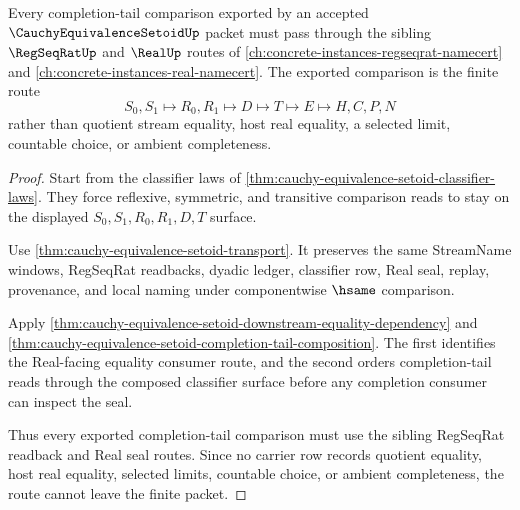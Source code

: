 \begin{theorem}
\label{thm:cauchy-equivalence-setoid-regseqrat-route}
Every completion-tail comparison exported by an accepted $\CauchyEquivalenceSetoidUp$ packet must pass through the sibling $\RegSeqRatUp$ and $\RealUp$ routes of \autoref{ch:concrete-instances-regseqrat-namecert} and \autoref{ch:concrete-instances-real-namecert}. The exported comparison is the finite route
$$
S_0,S_1 \longmapsto R_0,R_1 \longmapsto D \longmapsto T \longmapsto E \longmapsto H,C,P,N
$$
rather than quotient stream equality, host real equality, a selected limit, countable choice, or ambient completeness.
\end{theorem}
\begin{proof}
Start from the classifier laws of \autoref{thm:cauchy-equivalence-setoid-classifier-laws}. They force reflexive, symmetric, and transitive comparison reads to stay on the displayed $S_0,S_1,R_0,R_1,D,T$ surface.

Use \autoref{thm:cauchy-equivalence-setoid-transport}. It preserves the same StreamName windows, RegSeqRat readbacks, dyadic ledger, classifier row, Real seal, replay, provenance, and local naming under componentwise $\hsame$ comparison.

Apply \autoref{thm:cauchy-equivalence-setoid-downstream-equality-dependency} and \autoref{thm:cauchy-equivalence-setoid-completion-tail-composition}. The first identifies the Real-facing equality consumer route, and the second orders completion-tail reads through the composed classifier surface before any completion consumer can inspect the seal.

Thus every exported completion-tail comparison must use the sibling RegSeqRat readback and Real seal routes. Since no carrier row records quotient equality, host real equality, selected limits, countable choice, or ambient completeness, the route cannot leave the finite packet.
\end{proof}

